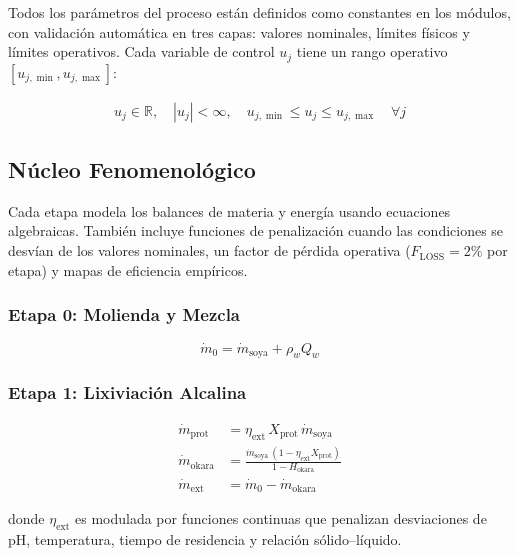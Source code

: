 \documentclass[10pt,letterpaper]{article}
\begin{document}
Todos los par\'ametros del proceso est\'an definidos como constantes en los m\'odulos, con validaci\'on autom\'atica en tres capas: valores nominales, l\'imites f\'isicos y l\'imites operativos. Cada variable de control $u_j$ tiene un rango operativo $[u_{j,\min}, u_{j,\max}]$:

\begin{align}
u_j \in \mathbb{R}, \quad |u_j| < \infty, \quad u_{j,\min} \leq u_j \leq u_{j,\max} \quad \forall j \label{eq:validation}
\end{align}

\subsection{N\'ucleo Fenomenol\'ogico}

Cada etapa modela los balances de materia y energ\'ia usando ecuaciones algebraicas. Tambi\'en incluye funciones de penalizaci\'on cuando las condiciones se desv\'ian de los valores nominales, un factor de p\'erdida operativa ($F_{\text{LOSS}}=2\%$ por etapa) y mapas de eficiencia emp\'iricos.

\subsubsection{Etapa 0: Molienda y Mezcla}

\begin{equation}
\dot{m}_{0} = \dot{m}_{\text{soya}} + \rho_w Q_w \label{eq:stage0_mass}
\end{equation}

\subsubsection{Etapa 1: Lixiviaci\'on Alcalina}

\begin{align}
\dot{m}_{\text{prot}} &= \eta_{\text{ext}} \, X_{\text{prot}} \, \dot{m}_{\text{soya}} \label{eq:stage1_extract} \\
\dot{m}_{\text{okara}} &= \frac{\dot{m}_{\text{soya}} \,(1 - \eta_{\text{ext}} X_{\text{prot}})}{1 - H_{\text{okara}}} \label{eq:stage1_okara} \\
\dot{m}_{\text{ext}} &= \dot{m}_0 - \dot{m}_{\text{okara}} \label{eq:stage1_extract_flow}
\end{align}

donde $\eta_{\text{ext}}$ es modulada por funciones continuas que penalizan desviaciones de pH, temperatura, tiempo de residencia y relaci\'on s\'olido--l\'iquido.
\end{document}
